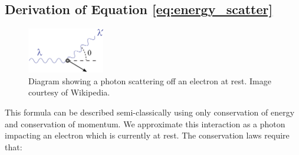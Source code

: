 \documentclass[%
 reprint,
 amsmath,amssymb,
 aps,
 pra,
]{revtex4-1}
\begin{document}
\begin{appendix}

\section{Derivation of Equation \ref{eq:energy_scatter}}

\begin{figure}[H]
	\centering
	\includegraphics[width=0.3\textwidth]{../plots/ComptonDiagram.png}
	\caption{Diagram showing a photon scattering off an electron at rest. Image courtesy of Wikipedia.}
\end{figure}

This formula can be described semi-classically using only conservation of energy and conservation of momentum. We approximate this interaction as a photon impacting an electron which is currently at rest. The conservation laws require that:


\end{appendix}
\end{document}
